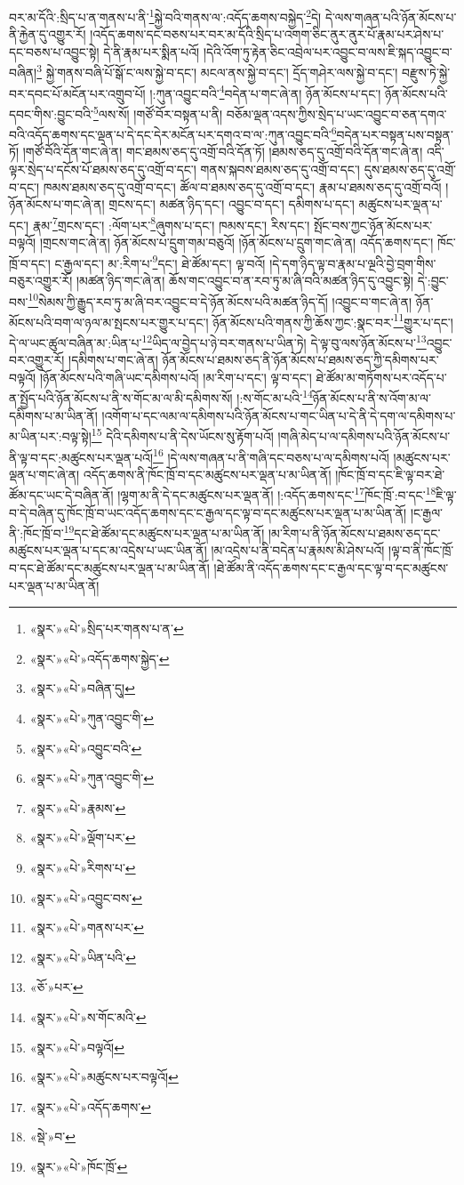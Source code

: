 བར་མ་དོའི་:སྲིད་པ་ན་གནས་པ་ནི་\footnote{«སྣར་»«པེ་»སྲིད་པར་གནས་པ་ན་}སྐྱེ་བའི་གནས་ལ་:འདོད་ཆགས་བསྐྱེད་\footnote{«སྣར་»«པེ་»འདོད་ཆགས་སྐྱེད་}དེ། དེ་ལས་གཞན་པའི་ཉོན་མོངས་པ་ནི་རྐྱེན་དུ་འགྱུར་རོ། །འདོད་ཆགས་དང་བཅས་པར་བར་མ་དོའི་སྲིད་པ་འགག་ཅིང་ནུར་ནུར་པོ་རྣམ་པར་ཤེས་པ་དང་བཅས་པ་འབྱུང་སྟེ། དེ་ནི་རྣམ་པར་སྨིན་པའོ། །དེའི་འོག་ཏུ་རྟེན་ཅིང་འབྲེལ་པར་འབྱུང་བ་ལས་ཇི་སྐད་འབྱུང་བ་བཞིན།\footnote{«སྣར་»«པེ་»བཞིན་དུ།} སྐྱེ་གནས་བཞི་པོ་སྒོ་ང་ལས་སྐྱེ་བ་དང་། མངལ་ནས་སྐྱེ་བ་དང་། དྲོད་གཤེར་ལས་སྐྱེ་བ་དང་། བརྫུས་ཏེ་སྐྱེ་བར་དབང་པོ་མངོན་པར་འགྲུབ་པོ། །:ཀུན་འབྱུང་བའི་\footnote{«སྣར་»«པེ་»ཀུན་འབྱུང་གི་}བདེན་པ་གང་ཞེ་ན། ཉོན་མོངས་པ་དང་། ཉོན་མོངས་པའི་དབང་གིས་:བྱུང་བའི་\footnote{«སྣར་»«པེ་»འབྱུང་བའི་}ལས་སོ། །གཙོ་བོར་བསྟན་པ་ནི། བཅོམ་ལྡན་འདས་ཀྱིས་སྲེད་པ་ཡང་འབྱུང་བ་ཅན་དགའ་བའི་འདོད་ཆགས་དང་ལྡན་པ་དེ་དང་དེར་མངོན་པར་དགའ་བ་ལ་:ཀུན་འབྱུང་བའི་\footnote{«སྣར་»«པེ་»ཀུན་འབྱུང་གི་}བདེན་པར་བསྟན་པས་བསྟན་ཏོ། །གཙོ་བོའི་དོན་གང་ཞེ་ན། གང་ཐམས་ཅད་དུ་འགྲོ་བའི་དོན་ཏོ། །ཐམས་ཅད་དུ་འགྲོ་བའི་དོན་གང་ཞེ་ན། འདི་ལྟར་སྲེད་པ་དངོས་པོ་ཐམས་ཅད་དུ་འགྲོ་བ་དང་། གནས་སྐབས་ཐམས་ཅད་དུ་འགྲོ་བ་དང་། དུས་ཐམས་ཅད་དུ་འགྲོ་བ་དང་། ཁམས་ཐམས་ཅད་དུ་འགྲོ་བ་དང་། ཚོལ་བ་ཐམས་ཅད་དུ་འགྲོ་བ་དང་། རྣམ་པ་ཐམས་ཅད་དུ་འགྲོ་བའོ། །ཉོན་མོངས་པ་གང་ཞེ་ན། གྲངས་དང་། མཚན་ཉིད་དང་། འབྱུང་བ་དང་། དམིགས་པ་དང་། མཚུངས་པར་ལྡན་པ་དང་། རྣམ་\footnote{«སྣར་»«པེ་»རྣམས་}གྲངས་དང་། :ལོག་པར་\footnote{«སྣར་»«པེ་»ལྡོག་པར་}ཞུགས་པ་དང་། ཁམས་དང་། རིས་དང་། སྤོང་བས་ཀྱང་ཉོན་མོངས་པར་བལྟའོ། །གྲངས་གང་ཞེ་ན། ཉོན་མོངས་པ་དྲུག་གམ་བཅུའོ། །ཉོན་མོངས་པ་དྲུག་གང་ཞེ་ན། འདོད་ཆགས་དང་། ཁོང་ཁྲོ་བ་དང་། ང་རྒྱལ་དང་། མ་:རིག་པ་\footnote{«སྣར་»«པེ་»རིགས་པ་}དང་། ཐེ་ཚོམ་དང་། ལྟ་བའོ། །དེ་དག་ཉིད་ལྟ་བ་རྣམ་པ་ལྔའི་བྱེ་བྲག་གིས་བཅུར་འགྱུར་རོ། །མཚན་ཉིད་གང་ཞེ་ན། ཆོས་གང་འབྱུང་བ་ན་རབ་ཏུ་མ་ཞི་བའི་མཚན་ཉིད་དུ་འབྱུང་སྟེ། དེ་:བྱུང་བས་\footnote{«སྣར་»«པེ་»འབྱུང་བས་}སེམས་ཀྱི་རྒྱུད་རབ་ཏུ་མ་ཞི་བར་འབྱུང་བ་དེ་ཉོན་མོངས་པའི་མཚན་ཉིད་དོ། །འབྱུང་བ་གང་ཞེ་ན། ཉོན་མོངས་པའི་བག་ལ་ཉལ་མ་སྤངས་པར་གྱུར་པ་དང་། ཉོན་མོངས་པའི་གནས་ཀྱི་ཆོས་ཀྱང་:སྣང་བར་\footnote{«སྣར་»«པེ་»གནས་པར་}གྱུར་པ་དང་། དེ་ལ་ཡང་ཚུལ་བཞིན་མ་:ཡིན་པ་\footnote{«སྣར་»«པེ་»ཡིན་པའི་}ཡིད་ལ་བྱེད་པ་ཉེ་བར་གནས་པ་ཡིན་ཏེ། དེ་ལྟ་བུ་ལས་ཉོན་མོངས་པ་\footnote{«ཅོ་»པར་}འབྱུང་བར་འགྱུར་རོ། །དམིགས་པ་གང་ཞེ་ན། ཉོན་མོངས་པ་ཐམས་ཅད་ནི་ཉོན་མོངས་པ་ཐམས་ཅད་ཀྱི་དམིགས་པར་བལྟའོ། །ཉོན་མོངས་པའི་གཞི་ཡང་དམིགས་པའོ། །མ་རིག་པ་དང་། ལྟ་བ་དང་། ཐེ་ཚོམ་མ་གཏོགས་པར་འདོད་པ་ན་སྤྱོད་པའི་ཉོན་མོངས་པ་ནི་ས་གོང་མ་ལ་མི་དམིགས་སོ། །:ས་གོང་མ་པའི་\footnote{«སྣར་»«པེ་»ས་གོང་མའི་}ཉོན་མོངས་པ་ནི་ས་འོག་མ་ལ་དམིགས་པ་མ་ཡིན་ནོ། །འགོག་པ་དང་ལམ་ལ་དམིགས་པའི་ཉོན་མོངས་པ་གང་ཡིན་པ་དེ་ནི་དེ་དག་ལ་དམིགས་པ་མ་ཡིན་པར་:བལྟ་སྟེ།\footnote{«སྣར་»«པེ་»བལྟའོ།} དེའི་དམིགས་པ་ནི་དེས་ཡོངས་སུ་རྟོག་པའོ། །གཞི་མེད་པ་ལ་དམིགས་པའི་ཉོན་མོངས་པ་ནི་ལྟ་བ་དང་:མཚུངས་པར་ལྡན་པའོ།\footnote{«སྣར་»«པེ་»མཚུངས་པར་བལྟའོ།} །དེ་ལས་གཞན་པ་ནི་གཞི་དང་བཅས་པ་ལ་དམིགས་པའོ། །མཚུངས་པར་ལྡན་པ་གང་ཞེ་ན། འདོད་ཆགས་ནི་ཁོང་ཁྲོ་བ་དང་མཚུངས་པར་ལྡན་པ་མ་ཡིན་ནོ། །ཁོང་ཁྲོ་བ་དང་ཇི་ལྟ་བར་ཐེ་ཚོམ་དང་ཡང་དེ་བཞིན་ནོ། །ལྷག་མ་ནི་དེ་དང་མཚུངས་པར་ལྡན་ནོ། །:འདོད་ཆགས་དང་\footnote{«སྣར་»«པེ་»འདོད་ཆགས་}ཁོང་ཁྲོ་:བ་དང་\footnote{«སྡེ་»བ་}ཇི་ལྟ་བ་དེ་བཞིན་དུ་ཁོང་ཁྲོ་བ་ཡང་འདོད་ཆགས་དང་ང་རྒྱལ་དང་ལྟ་བ་དང་མཚུངས་པར་ལྡན་པ་མ་ཡིན་ནོ། །ང་རྒྱལ་ནི་:ཁོང་ཁྲོ་བ་\footnote{«སྣར་»«པེ་»ཁོང་ཁྲོ་}དང་ཐེ་ཚོམ་དང་མཚུངས་པར་ལྡན་པ་མ་ཡིན་ནོ། །མ་རིག་པ་ནི་ཉོན་མོངས་པ་ཐམས་ཅད་དང་མཚུངས་པར་ལྡན་པ་དང་མ་འདྲེས་པ་ཡང་ཡིན་ནོ། །མ་འདྲེས་པ་ནི་བདེན་པ་རྣམས་མི་ཤེས་པའོ། །ལྟ་བ་ནི་ཁོང་ཁྲོ་བ་དང་ཐེ་ཚོམ་དང་མཚུངས་པར་ལྡན་པ་མ་ཡིན་ནོ། །ཐེ་ཚོམ་ནི་འདོད་ཆགས་དང་ང་རྒྱལ་དང་ལྟ་བ་དང་མཚུངས་པར་ལྡན་པ་མ་ཡིན་ནོ། 